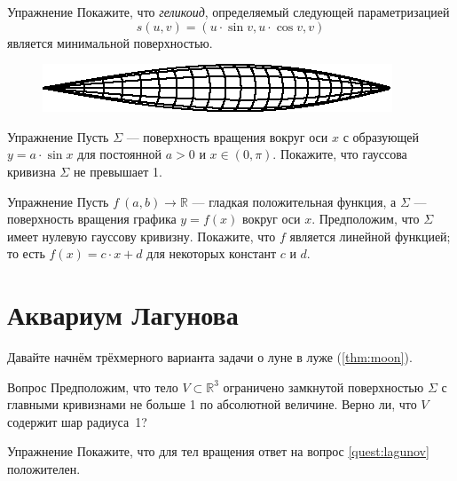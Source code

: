 \begin{thm}{Упражнение}\label{ex:helicoid-is-minimal}
Покажите, что \emph{геликоид}, определяемый следующей параметризацией
\[s(u,v)=(u\cdot \sin v,u\cdot \cos v,v)\]
является минимальной поверхностью.
\end{thm}

\begin{figure}
\vskip-6mm
\centering
\includegraphics{asy/sin-mini}
\vskip0mm
\end{figure}

\begin{thm}{Упражнение}\label{ex:rev(sin)}
Пусть $\Sigma$ --- поверхность вращения вокруг оси $x$
с образующей $y=a\cdot \sin x$ для постоянной $a>0$ и $x\in (0,\pi)$.
Покажите, что гауссова кривизна $\Sigma$ не превышает 1.
\end{thm}

\begin{thm}{Упражнение}\label{ex:rev(lin)}
Пусть $f\:(a,b)\to\mathbb{R}$ --- гладкая положительная функция, а $\Sigma$ --- поверхность вращения графика $y=f(x)$ вокруг оси $x$.
Предположим, что $\Sigma$ имеет нулевую гауссову кривизну.
Покажите, что $f$ является линейной функцией; то есть $f(x)=c\cdot x+d$ для некоторых констант $c$ и $d$.
\end{thm}


\section{Аквариум Лагунова}

Давайте начнём трёхмерного варианта задачи о луне в луже (\ref{thm:moon}).

\begin{thm}{Вопрос}\label{quest:lagunov}
Предположим, что тело $V\subset \mathbb{R}^3$ ограничено замкнутой поверхностью $\Sigma$ с 
главными кривизнами не больше 1 по абсолютной величине.
Верно ли, что $V$ содержит шар радиуса~1?
\end{thm}

\begin{thm}{Упражнение}\label{ex:moon-revolution}
Покажите, что для тел вращения ответ на вопрос \ref{quest:lagunov} положителен.
\end{thm}

